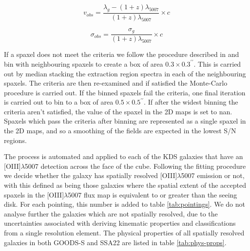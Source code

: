 \documentclass[fleqn,usenatbib]{mn2e}
\begin{document}
\begin{equation}\label{eq:velocity_comp}
   v_{obs} = \frac{\lambda_{g} - (1 + z)\lambda_{5007}}{(1 + z)\lambda_{5007}} \times c
\end{equation}

\begin{equation}\label{eq:dispersion_comp}
   \sigma_{obs} = \frac{\sigma_{g}}{(1 + z)\lambda_{5007}} \times c
\end{equation}

If a spaxel does not meet the criteria we follow the procedure described in \cite{Stott2016} and bin with neighbouring spaxels to create a box of area $0.3\times0.3^{\prime\prime}$.
This is carried out by median stacking the extraction region spectra in each of the neighbouring spaxels.
The criteria are then re-examined and if satisfied the Monte-Carlo procedure is carried out. 
If the binned spaxels fail the criteria, one final iteration is carried out to bin to a box of area $0.5\times0.5^{\prime\prime}$.
If after the widest binning the criteria aren't satisfied, the value of the spaxel in the 2D maps is set to nan.
Spaxels which pass the criteria after binning are represented as a single spaxel in the 2D maps, and so a smoothing of the fields are expected in the lowest S/N regions.

The process is automated and applied to each of the KDS galaxies that have an [OIII]$\lambda$5007 detection across the face of the cube.
Following the fitting procedure we decide whether the galaxy has spatially resolved [OIII]$\lambda$5007 emission or not, with this defined as being those galaxies where the spatial extent of the accepted spaxels in the [OIII]$\lambda$5007 flux map is equivalent to or greater than the seeing disk.
For each pointing, this number is added to table \ref{tab:pointings}.
We do not analyse further the galaxies which are not spatially resolved, due to the uncertainties associated with deriving kinematic properties and classifications from a single resolution element.
The physical properties of all spatially resolved galaxies in both GOODS-S and SSA22 are listed in table \ref{tab:phys-props}.
\end{document}
